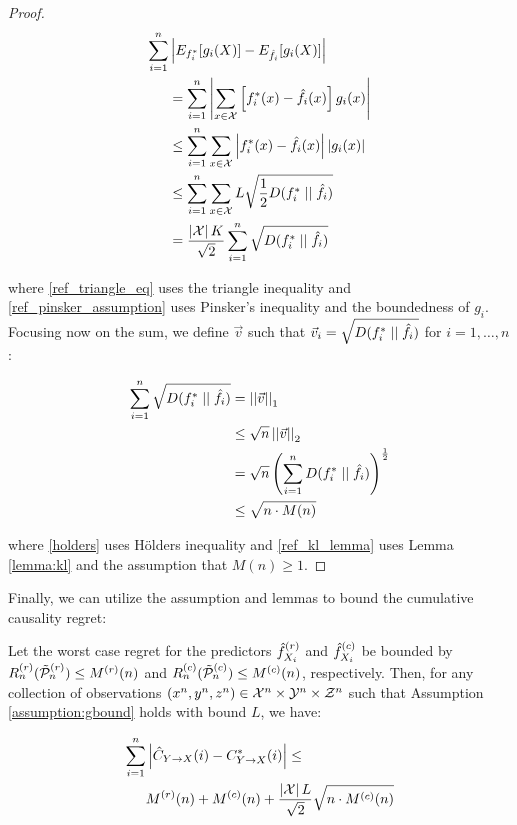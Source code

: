 \begin{proof}
\begin{align}
\sum_{i=1}^n &\left| E_{f^*_i} [g_i(X)] -
    E_{\hat{f}_i}[g_i(X)] \right| \\
&= \sum_{i=1}^n \left| \sum_{x\in\mc{X}}
    \left[ f^*_i(x) - \hat{f}_i(x) \right] g_i(x) \right| \\
&\le \sum_{i=1}^n \sum_{x\in\mc{X}} \left| f^*_i(x) -
    \hat{f}_i(x) \right| \left| g_i(x) \right|
    \label{ref_triangle_eq}\\
&\le \sum_{i=1}^n \sum_{x\in\mc{X}}
    L\sqrt{\frac{1}{2}\kl{f^*_i}{\hat{f}_i}}
    \label{ref_pinsker_assumption}\\
&= \frac{\left|\mc{X}\right| K}{\sqrt{2}} \sum_{i=1}^n
    \sqrt{\kl{f^*_i}{\hat{f}_i}}
\end{align}

\noindent where \eqref{ref_triangle_eq} uses the triangle inequality and \eqref{ref_pinsker_assumption} uses Pinsker's inequality and the boundedness of $g_i$. Focusing now on the sum, we define $\vec{v}$ such that $\vec{v}_i = \sqrt{D(f^*_i \mid \mid \hat{f}_i)}$ for $i=1,\dots,n$:

\begin{align}
\sum_{i=1}^n \sqrt{\kl{f^*_i}{\hat{f}_i}}
&= \left|\left|\vec{v}\right|\right|_1 \\
&\le \sqrt{n}\left|\left|\vec{v}\right|\right|_2 \label{holders}\\
&= \sqrt{n}\left( \sum_{i=1}^n \kl{f^*_i}{\hat{f}_i}
    \right)^{\frac{1}{2}} \\
&\le \sqrt{n \cdot M(n)} \label{ref_kl_lemma}
\end{align}

\noindent where \eqref{holders} uses H\"{o}lders inequality and \eqref{ref_kl_lemma} uses Lemma \ref{lemma:kl} and the assumption that $M(n) \ge 1$.
\end{proof}

Finally, we can utilize the assumption and lemmas to bound the cumulative causality regret:

\begin{theorem}
Let the worst case regret for the predictors $\hat{f}_{X_i}^{(r)}$ and $\hat{f}_{X_i}^{(c)}$ be bounded by $R^{(r)}_n(\tilde{\mathcal{P}}^{(r)}_n) \le M^{(r)}(n)$ and $R^{(c)}_n(\tilde{\mathcal{P}}^{(c)}_n) \le M^{(c)}(n)$, respectively. Then, for any collection of observations $(x^n,y^n,z^n)\in \mathcal{X}^n \times \mathcal{Y}^n \times \mathcal{Z}^n$ such that Assumption \ref{assumption:gbound} holds with bound $L$, we have:

\begin{equation} \label{causal_bound}
\begin{aligned}
\sum_{i=1}^n & \left| \estcyx(i) - \optcyx(i) \right| \le \\
&M^{(r)}(n) + M^{(c)}(n) +
    \frac{\left|\mc{X}\right|L}{\sqrt{2}}\sqrt{n \cdot M^{(c)}(n)}
\end{aligned}
\end{equation}
\end{theorem}

